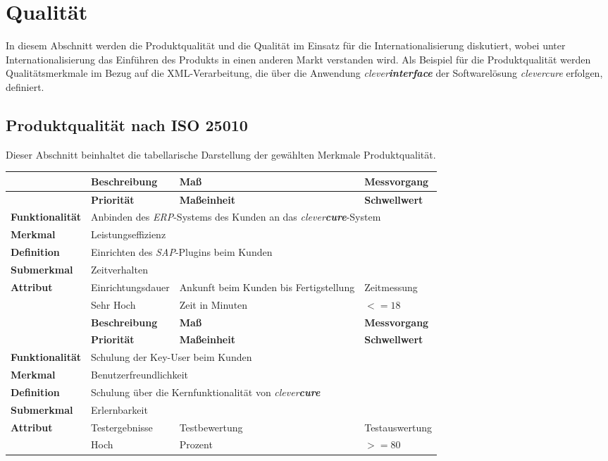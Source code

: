 \section{Qualität}
\label{sec:quality}
In diesem Abschnitt werden die Produktqualität und die Qualität im Einsatz für die Internationalisierung diskutiert, wobei unter Internationalisierung das Einführen des Produkts in einen anderen Markt verstanden wird.
\newline
\newline
Als Beispiel für die Produktqualität werden Qualitätsmerkmale im Bezug auf die XML-Verarbeitung, die über die Anwendung \emph{clever\textbf{interface}} der Softwarelösung \emph{clevercure} erfolgen, definiert.
\subsection{Produktqualität nach ISO 25010}
\label{sec:qualtity-product-quality}
Dieser Abschnitt beinhaltet die tabellarische Darstellung der gewählten Merkmale Produktqualität.
\bgroup
\def\arraystretch{1.5}%
\begin{tabularx}{\textwidth}{ p{70pt} | X | X | X }
	\hline
	& \textbf{Beschreibung} & \textbf{Maß} & \textbf{Messvorgang} \\ \hline
	& \textbf{Priorität} & \textbf{Maßeinheit} & \textbf{Schwellwert} \\ \hline
	\textbf{Funktionalität} & \multicolumn{3}{p{300pt}}{Anbinden des \emph{ERP}-Systems des Kunden an das \emph{clever\textbf{cure}}-System} \\ \hline
	\textbf{Merkmal} & \multicolumn{3}{X}{Leistungseffizienz} \\ \hline
	\textbf{Definition} & \multicolumn{3}{p{380pt}}{Einrichten des \emph{SAP}-Plugins beim Kunden} \\ \hline
	\textbf{Submerkmal} & \multicolumn{3}{X}{Zeitverhalten} \\ \hline 
	\textbf{Attribut} & Einrichtungsdauer & Ankunft beim Kunden bis Fertigstellung & Zeitmessung  \\ \hline
	               & Sehr Hoch               & Zeit in Minuten & $<= 18$  \\ 
    \hline 
    \hline 
	& \textbf{Beschreibung} & \textbf{Maß} & \textbf{Messvorgang} \\ \hline
	& \textbf{Priorität} & \textbf{Maßeinheit} & \textbf{Schwellwert} \\ \hline
	\textbf{Funktionalität} & \multicolumn{3}{p{300pt}}{Schulung der Key-User beim Kunden} \\ \hline
	\textbf{Merkmal} & \multicolumn{3}{X}{Benutzerfreundlichkeit} \\ \hline
	\textbf{Definition} & \multicolumn{3}{p{380pt}}{Schulung über die Kernfunktionalität von \emph{clever\textbf{cure}}} \\ \hline
	\textbf{Submerkmal} & \multicolumn{3}{X}{Erlernbarkeit} \\ \hline 
	\textbf{Attribut} & Testergebnisse & Testbewertung  & Testauswertung  \\ \hline
	& Hoch               & Prozent & $>= 80$  \\ \hline
\end{tabularx}
